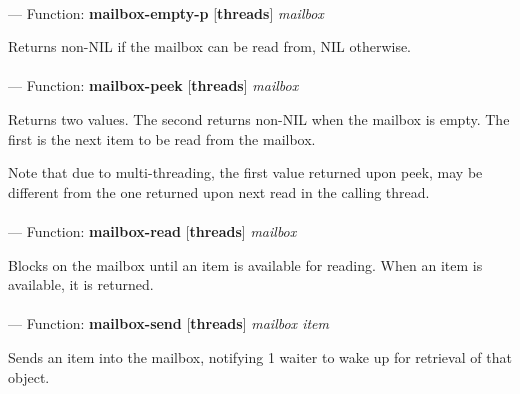 \paragraph{}
\label{THREADS:MAILBOX-EMPTY-P}
--- Function: \textbf{mailbox-empty-p} [\textbf{threads}] \textit{mailbox}

\begin{adjustwidth}{5em}{5em}
Returns non-NIL if the mailbox can be read from, NIL otherwise.
\end{adjustwidth}

\paragraph{}
\label{THREADS:MAILBOX-PEEK}
--- Function: \textbf{mailbox-peek} [\textbf{threads}] \textit{mailbox}

\begin{adjustwidth}{5em}{5em}
Returns two values. The second returns non-NIL when the mailbox
is empty. The first is the next item to be read from the mailbox.

Note that due to multi-threading, the first value returned upon
peek, may be different from the one returned upon next read in the
calling thread.
\end{adjustwidth}

\paragraph{}
\label{THREADS:MAILBOX-READ}
--- Function: \textbf{mailbox-read} [\textbf{threads}] \textit{mailbox}

\begin{adjustwidth}{5em}{5em}
Blocks on the mailbox until an item is available for reading.
When an item is available, it is returned.
\end{adjustwidth}

\paragraph{}
\label{THREADS:MAILBOX-SEND}
--- Function: \textbf{mailbox-send} [\textbf{threads}] \textit{mailbox item}

\begin{adjustwidth}{5em}{5em}
Sends an item into the mailbox, notifying 1 waiter
to wake up for retrieval of that object.
\end{adjustwidth}

